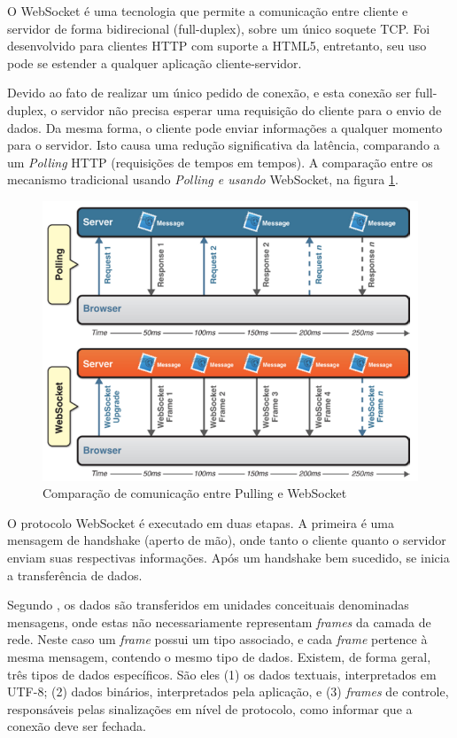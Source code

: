 O WebSocket é uma tecnologia que permite a comunicação entre cliente
e servidor de forma bidirecional (full-duplex), sobre um único soquete
TCP. Foi desenvolvido para clientes HTTP com suporte a HTML5, entretanto,
seu uso pode se estender a qualquer aplicação cliente-servidor\cite{Salim2013,Fette2011}. 

Devido ao fato de realizar um único pedido de conexão, e esta conexão
ser full-duplex, o servidor não precisa esperar uma requisição do
cliente para o envio de dados. Da mesma forma, o cliente pode enviar
informações a qualquer momento para o servidor. Isto causa uma redução
significativa da latência, comparando a um \emph{Polling} HTTP (requisições
de tempos em tempos). A comparação entre os mecanismo tradicional
usando \emph{Polling e usando }WebSocket, na figura \ref{fig:websocket}.

\begin{figure}[h]
\begin{centering}
\includegraphics[width=1\linewidth]{Imagens/Cap_2/websocket_polling}
\par\end{centering}
\caption{Comparação de comunicação entre Pulling e WebSocket \cite{Salim2013}\label{fig:websocket}}
\end{figure}
 

O protocolo WebSocket é executado em duas etapas. A primeira é uma
mensagem de handshake (aperto de mão), onde tanto o cliente quanto
o servidor enviam suas respectivas informações. Após um handshake
bem sucedido, se inicia a transferência de dados. 

Segundo \cite{Fette2011}, os dados são transferidos em unidades conceituais
denominadas mensagens, onde estas não necessariamente representam
\emph{frames} da camada de rede. Neste caso um \emph{frame} possui
um tipo associado, e cada \emph{frame} pertence à mesma mensagem,
contendo o mesmo tipo de dados. Existem, de forma geral, três tipos
de dados específicos. São eles (1) os dados textuais, interpretados
em UTF-8; (2) dados binários, interpretados pela aplicação, e (3)
\emph{frames} de controle, responsáveis pelas sinalizações em nível
de protocolo, como informar que a conexão deve ser fechada. 


